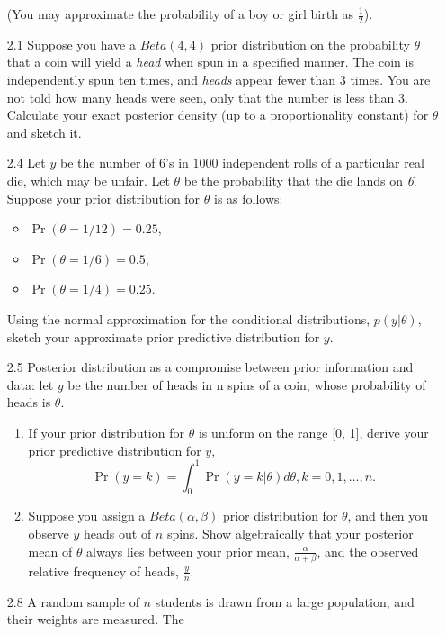 \documentclass[12pt,a4paper,twoside]{article}
\begin{document}
\begin{enumerate}
    (You may approximate the probability of a boy or girl birth as $\frac{1}{2}$)\cite{Chapter1Exercises}.
    \item[2.1] Suppose you have a $Beta(4, 4)$ prior distribution on the probability $\theta$ that a coin will yield a \textit{head} when
    spun in a specified manner. The coin is independently spun ten times, and \textit{heads} appear fewer than 3 times. You are not
    told how many heads were seen, only that the number is less than 3. Calculate your exact posterior density (up to a proportionality
    constant) for $\theta$ and sketch it\cite{Chapter2Exercises}.
    \item[2.4] Let $y$ be the number of 6's in $1000$ independent rolls of a particular real die, which may be unfair. Let $\theta$ be the
    probability that the die lands on \textit{6}. Suppose your prior distribution for $\theta$ is as follows\cite{Chapter2Exercises}:
    \begin{itemize} 
        \item $\Pr(\theta = 1/12) = 0.25$,
        \item $\Pr(\theta = 1/6) = 0.5$,
        \item $\Pr(\theta = 1/4) = 0.25$.
    \end{itemize}
    Using the normal approximation for the conditional distributions, $p(y|\theta)$, sketch your approximate prior predictive distribution
    for $y$.
    \item[2.5] Posterior distribution as a compromise between prior information and data: let $y$ be the number of heads in n spins of a coin,
    whose probability of heads is $\theta$\cite{Chapter2Exercises}.
    \begin{enumerate}[label=$\alph*)$]
        \item If your prior distribution for $\theta$ is uniform on the range [0, 1], derive your prior predictive distribution for $y$,
        \[
        \Pr(y = k) = \int_{0}^{1} \Pr(y = k|\theta) d\theta, k = 0, 1, . . . , n.
        \]
        \item Suppose you assign a $Beta(\alpha, \beta)$ prior distribution for $\theta$, and then you observe $y$ heads
        out of $n$ spins. Show algebraically that your posterior mean of $\theta$ always lies between your prior mean,
        $\frac{\alpha}{\alpha + \beta}$, and the observed relative frequency of heads, $\frac{y}{n}$.
    \end{enumerate}
    \item[2.8] A random sample of $n$ students is drawn from a large population, and their weights are measured. The

\end{enumerate}
\end{document}
